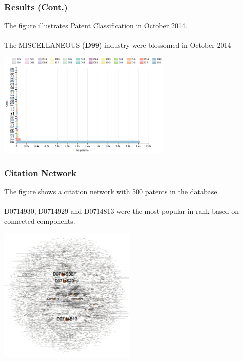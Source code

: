 \documentclass{beamer}
\begin{document}
\begin{frame}
\frametitle{Results (Cont.)}
The figure illustrates Patent Classification in October 2014.\\~\\
The MISCELLANEOUS (\textbf{D99}) industry were blossomed in October 2014
\begin{center}
\includegraphics[height=2in]{rplot-classification.png}
\end{center}
\end{frame}

\begin{frame}
\frametitle{Citation Network}
The figure shows a citation network with 500 patents in the database.\\~\\
D0714930, D0714929 and D0714813 were the most popular in rank based on connected components.
\begin{center}
\includegraphics[height=2.6in]{citation-label.png}
\end{center}
\end{frame}
\end{document}
